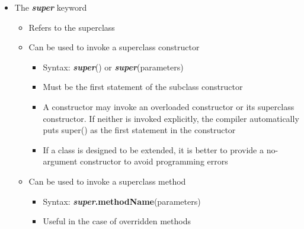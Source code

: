 \documentclass[11pt]{article}
\begin{document}
\begin{itemize}
	\item The \textbf{\textit{super}} keyword
		\begin{itemize}
			\item Refers to the superclass
			\item Can be used to invoke a superclass constructor
				\begin{itemize}
					\item Syntax: \textbf{\textit{super}}() or \textbf{\textit{super}}(parameters)
					\item  Must be the first statement of the subclass constructor
					\item  A constructor may invoke an overloaded constructor or its superclass constructor. If neither is invoked explicitly, the compiler automatically puts super() as the first statement in the constructor
					\item  If a class is designed to be extended, it is better to provide a no-argument constructor to avoid programming errors
				\end{itemize}
			\item Can be used to invoke a superclass method
				\begin{itemize}
					\item Syntax: \textbf{\textit{super}.methodName}(parameters)
					\item Useful in the case of overridden methods
				\end{itemize}
		\end{itemize}


\end{itemize}
\end{document}
